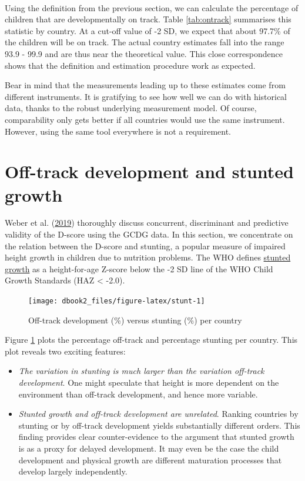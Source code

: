 \documentclass[
]{book}
\providecommand{\tightlist}{%
  \setlength{\itemsep}{0pt}\setlength{\parskip}{0pt}}
\begin{document}
~

Using the definition from the previous section, we can calculate the percentage of children that are developmentally on track. Table \ref{tab:ontrack} summarises this statistic by country. At a cut-off value of -2 SD, we expect that about 97.7\% of the children will be on track. The actual country estimates fall into the range 93.9 - 99.9 and are thus near the theoretical value. This close correspondence shows that the definition and estimation procedure work as expected.

Bear in mind that the measurements leading up to these estimates come from different instruments. It is gratifying to see how well we can do with historical data, thanks to the robust underlying measurement model. Of course, comparability only gets better if all countries would use the same instrument. However, using the same tool everywhere is not a requirement.

\hypertarget{sec:otherestimates}{%
\section{Off-track development and stunted growth}\label{sec:otherestimates}}

Weber et al. (\protect\hyperlink{ref-Weber2019}{2019}) thoroughly discuss concurrent, discriminant and predictive validity of the D-score using the GCDG data. In this section, we concentrate on the relation between the D-score and stunting, a popular measure of impaired height growth in children due to nutrition problems. The WHO defines \href{https://www.who.int/nutrition/healthygrowthproj/en/index1.html}{stunted growth} as a height-for-age Z-score below the -2 SD line of the WHO Child Growth Standards (HAZ \textless{} -2.0).

\begin{figure}

{\centering \texttt{[image: dbook2\_files/figure-latex/stunt-1]} 

}

\caption{Off-track development (\%) versus stunting (\%) per country}\label{fig:stunt}
\end{figure}



Figure \ref{fig:stunt} plots the percentage off-track and percentage stunting per country. This plot reveals two exciting features:

\begin{itemize}
\tightlist
\item
  \emph{The variation in stunting is much larger than the variation off-track development}. One might speculate that height is more dependent on the environment than off-track development, and hence more variable.
\item
  \emph{Stunted growth and off-track development are unrelated}. Ranking countries by stunting or by off-track development yields substantially different orders. This finding provides clear counter-evidence to the argument that stunted growth is as a proxy for delayed development. It may even be the case the child development and physical growth are different maturation processes that develop largely independently.
\end{itemize}
\end{document}
